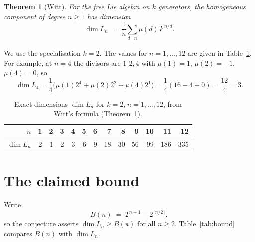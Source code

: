 \documentclass[11pt]{article}
\newtheorem{theorem}{Theorem}
\theoremstyle{definition}
\theoremstyle{remark}
\begin{document}
\begin{theorem}[Witt]
\label{thm:witt}
For the free Lie algebra on $k$ generators, the homogeneous component of degree
$n \ge 1$ has dimension
\[
\dim L_n \;=\; \frac1n \sum_{d \mid n} \mu(d)\, k^{\,n/d}.
\]
\end{theorem}

We use the specialisation $k = 2$. The values for $n = 1,\dots,12$ are given in
Table~\ref{tab:dim}. For example, at $n = 4$ the divisors are $1,2,4$ with
$\mu(1)=1$, $\mu(2)=-1$, $\mu(4)=0$, so
\[
\dim L_4
= \frac14\bigl(\mu(1)2^{4} + \mu(2)2^{2} + \mu(4)2^{1}\bigr)
= \frac14(16 - 4 + 0)
= \frac{12}{4}
= 3 .
\]

\begin{table}[h]
\centering
\begin{tabular}{r|r|r|r|r|r|r|r|r|r|r|r|r}
$n$ & 1 & 2 & 3 & 4 & 5 & 6 & 7 & 8 & 9 & 10 & 11 & 12 \\
\hline
$\dim L_n$ & 2 & 1 & 2 & 3 & 6 & 9 & 18 & 30 & 56 & 99 & 186 & 335
\end{tabular}
\caption{Exact dimensions $\dim L_n$ for $k=2$, $n = 1,\dots,12$, from
Witt's formula (Theorem~\ref{thm:witt}).}
\label{tab:dim}
\end{table}

\section{The claimed bound}

Write
\[
B(n) \;=\; 2^{\,n-1} - 2^{\lceil n/2\rceil},
\]
so the conjecture asserts $\dim L_n \ge B(n)$ for all $n \ge 2$.
Table~\ref{tab:bound} compares $B(n)$ with $\dim L_n$.
\end{document}
